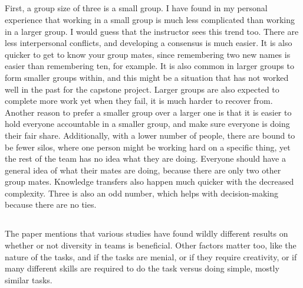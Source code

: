 \documentclass[letterpaper,12pt]{article}
\begin{document}
\subsection{}
First, a group size of three is a small group. I have found in my personal
experience that working in a small group is much less complicated than working
in a larger group. I would guess that the instructor sees this trend too.  There
are less interpersonal conflicts, and developing a consensus is much easier. It
is also quicker to get to know your group mates, since remembering two new names
is easier than remembering ten, for example. It is also common in larger groups
to form smaller groups within, and this might be a situation that has not worked
well in the past for the capstone project. Larger groups are also expected to
complete more work yet when they fail, it is much harder to recover from.
Another reason to prefer a smaller group over a larger one
is that it is easier to hold everyone accountable in a smaller group, and make
sure everyone is doing their fair share.  Additionally, with a lower number of
people, there are bound to be fewer silos, where one person might be working hard
on a specific thing, yet the rest of the team has no idea what they are doing.
Everyone should have a general idea of what their mates are doing,  because
there are only two other group mates.  Knowledge transfers also happen much quicker with
the decreased complexity. Three is also an odd number, which helps with 
decision-making because there are no ties.

\subsection{}
The paper mentions that various studies have found wildly different results on
whether or not diversity in teams is beneficial. Other factors matter too, like
the nature of the tasks, and if the tasks are menial, or if they require
creativity, or if many different skills are required to do the task versus doing
simple, mostly similar tasks.
\end{document}
